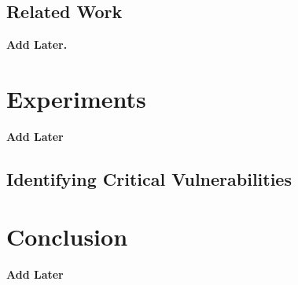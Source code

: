 \documentclass[sigconf]{aamas}  %
\theoremstyle{definition}
\theoremstyle{definition}
\begin{document}
\subsection{Related Work}\label{subsec:relwork}
\textbf{Add Later.}








\section{Experiments}\label{sec:expts}
\textbf{Add Later}

\subsection{Identifying Critical Vulnerabilities}

\section{Conclusion}\label{sec:conclusion}
\textbf{Add Later}





\end{document}
